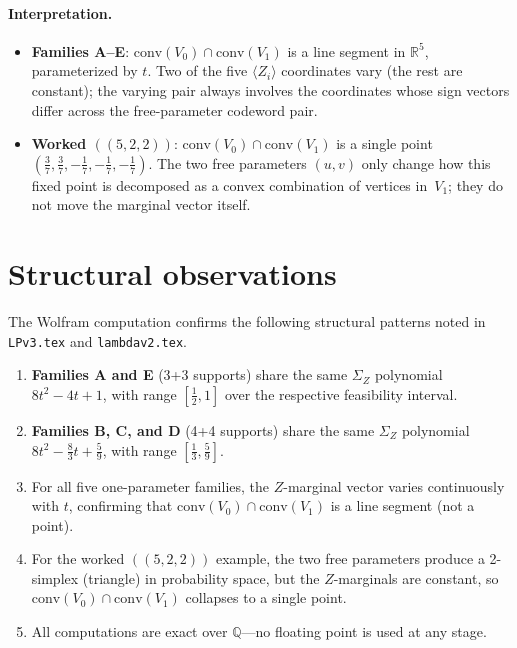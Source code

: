 \documentclass{article}
\newcommand{\SigZ}{\Sigma_Z}
\newcommand{\conv}{\mathrm{conv}}
\begin{document}
\paragraph{Interpretation.}
\begin{itemize}
\item \textbf{Families A--E}: $\conv(V_0)\cap\conv(V_1)$ is a line segment in $\mathbb{R}^5$, parameterized by $t$.
  Two of the five $\langle Z_i\rangle$ coordinates vary (the rest are constant);
  the varying pair always involves the coordinates whose sign vectors differ across the free-parameter codeword pair.
\item \textbf{Worked $((5,2,2))$}: $\conv(V_0)\cap\conv(V_1)$ is a single point $(\frac{3}{7},\frac{3}{7},-\frac{1}{7},-\frac{1}{7},-\frac{1}{7})$.
  The two free parameters $(u,v)$ only change how this fixed point is decomposed as a convex combination of vertices in~$V_1$; they do not move the marginal vector itself.
\end{itemize}

\section{Structural observations}
\label{sec:observations}

The Wolfram computation confirms the following structural patterns noted in \texttt{LPv3.tex} and \texttt{lambdav2.tex}.

\begin{enumerate}
\item \textbf{Families A and E} (3+3 supports) share the same $\SigZ$ polynomial
  $8t^2-4t+1$, with range $[\frac{1}{2},1]$ over the respective feasibility interval.

\item \textbf{Families B, C, and D} (4+4 supports) share the same $\SigZ$ polynomial
  $8t^2-\frac{8}{3}t+\frac{5}{9}$, with range $[\frac{1}{3},\frac{5}{9}]$.

\item For all five one-parameter families, the $Z$-marginal vector varies continuously with $t$, confirming that $\conv(V_0)\cap\conv(V_1)$ is a line segment (not a point).

\item For the worked $((5,2,2))$ example, the two free parameters produce a 2-simplex (triangle) in probability space, but the $Z$-marginals are constant, so $\conv(V_0)\cap\conv(V_1)$ collapses to a single point.

\item All computations are exact over $\mathbb{Q}$---no floating point is used at any stage.
\end{enumerate}
\end{document}
